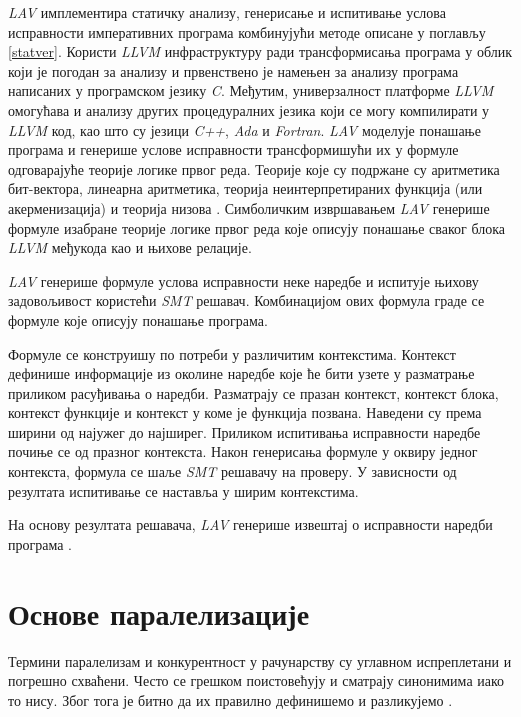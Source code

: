 \documentclass[12pt,oneside]{memoir}
\newtheorem{definic}{Дефиниција}
\begin{document}
	\textit{LAV} имплементира статичку анализу, генерисање и испитивање услова исправности императивних програма комбинујући методе описане у поглављу \ref{statver}. Користи \textit{LLVM} инфраструктуру ради трансформисања програма у облик који је погодан за анализу и првенствено је намењен за анализу програма написаних у програмском језику \textit{C}. Међутим, универзалност платформе \textit{LLVM} омогућава и анализу других процедуралних језика који се могу компилирати у \textit{LLVM} код, као што су језици \textit{C++}, \textit{Ada} и \textit{Fortran}. \textit{LAV} моделује понашање програма и генерише услове исправности трансформишући их у формуле одговарајуће теорије логике првог реда. Теорије које су подржане су аритметика бит-вектора, линеарна аритметика, теорија неинтерпретираних функција (или акерменизација) и теорија низова \cite{smt}.  Симболичким извршавањем \textit{LAV} генерише формуле изабране теорије логике првог реда које описују понашање сваког блока \textit{LLVM} међукода као и њихове релације. 
	
	\textit{LAV} генерише формуле услова исправности неке наредбе и испитује њихову задовољивост користећи \textit{SMT} решавач. Комбинацијом ових формула граде се формуле које описују понашање програма. 
	
	 Формуле се конструишу по потреби у различитим контекстима. Контекст дефинише информације из околине наредбе које ће бити узете у разматрање приликом расуђивања о наредби. Разматрају се празан контекст, контекст блока, контекст функције и контекст у коме је функција позвана. Наведени су према ширини од најужег до најширег. Приликом испитивања исправности наредбе почиње се од празног контекста.  Након генерисања формуле у оквиру једног контекста, формула се шаље \textit{SMT} решавачу на проверу. У зависности од резултата испитивање се наставља у ширим контекстима. 
	 
 На основу резултата решавача, \textit{LAV} генерише извештај о исправности наредби програма \cite{mvjdev}. 	
	 
	
\chapter{Основе паралелизације}
	Термини паралелизам и конкурентност у рачунарству су углавном испреплетани и погрешно схваћени. Често се грешком поистовећују и сматрају синонимима иако то нису. Због тога је битно да их правилно дефинишемо и разликујемо \cite{par_computing}.
\end{document}
